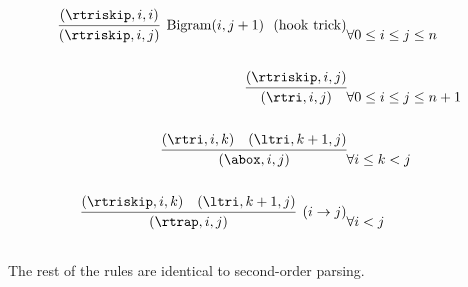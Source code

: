 \documentclass{article}
\begin{document}
\begin{eqnarray*}
\infer[\mathrm{Bigram}(i,j+1) \ \ \mathrm{(hook\ trick)}]{(\rtriskip, i,j)}{(\rtriskip, i, i)} &  \forall 0 \leq i \leq j \leq n\\\\
\infer{(\rtri, i,j)}{(\rtriskip, i, j)} &  \forall0 \leq i \leq j\leq n + 1\\\\
\infer{(\abox, i,j)}{(\rtri, i,k)  &  (\ltri, k+1, j) } &  \forall i\leq k < j \\\\
\infer[(i \rightarrow j)]{(\rtrap, i,j)}{(\rtriskip, i,k)  &  (\ltri, k+1, j) } &  \forall i < j\\\\




\end{eqnarray*}
The rest of the rules are identical to second-order parsing.




\end{document}
